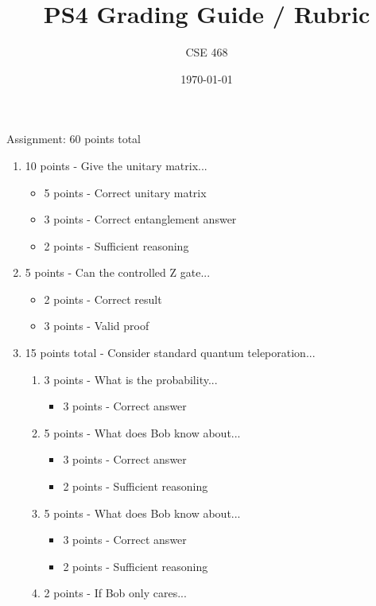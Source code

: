 \documentclass[12pt]{article}
\title{PS4 Grading Guide / Rubric}
\author{CSE 468}
\date{\today}
\begin{document}
\maketitle

Assignment: 60 points total
\begin{enumerate}[font=\bfseries]
    \item 10 points - Give the unitary matrix...
        \begin{itemize}
            \item 5 points - Correct unitary matrix
            \item 3 points - Correct entanglement answer
            \item 2 points - Sufficient reasoning
        \end{itemize}
    \item 5 points - Can the controlled Z gate...
        \begin{itemize}
            \item 2 points - Correct result
            \item 3 points - Valid proof
        \end{itemize}
    \item 15 points total - Consider standard quantum teleporation...
        \begin{enumerate}
            \item 3 points - What is the probability...
            \begin{itemize}
                \item 3 points - Correct answer
            \end{itemize}
            \item 5 points - What does Bob know about...
            \begin{itemize}
                \item 3 points - Correct answer
                \item 2 points - Sufficient reasoning
            \end{itemize}
            \item 5 points - What does Bob know about...
            \begin{itemize}
                \item 3 points - Correct answer
                \item 2 points - Sufficient reasoning
            \end{itemize}
            \item 2 points - If Bob only cares...
            \begin{itemize}

\end{itemize}
\end{enumerate}
\end{enumerate}
\end{document}
